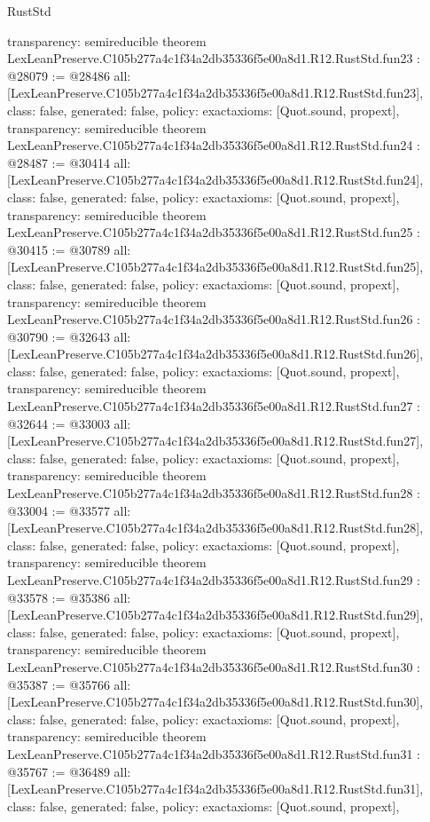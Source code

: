 \begin{lexlean}{RustStd}
\begin{coremodule}
{  transparency: semireducible
}
theorem LexLeanPreserve.C105b277a4c1f34a2db35336f5e00a8d1.R12.RustStd.fun23 : @28079 := @28486 {
  all: [LexLeanPreserve.C105b277a4c1f34a2db35336f5e00a8d1.R12.RustStd.fun23],
  class: false,
  generated: false,
  policy: exact{axioms: [Quot.sound, propext]},
  transparency: semireducible
}
theorem LexLeanPreserve.C105b277a4c1f34a2db35336f5e00a8d1.R12.RustStd.fun24 : @28487 := @30414 {
  all: [LexLeanPreserve.C105b277a4c1f34a2db35336f5e00a8d1.R12.RustStd.fun24],
  class: false,
  generated: false,
  policy: exact{axioms: [Quot.sound, propext]},
  transparency: semireducible
}
theorem LexLeanPreserve.C105b277a4c1f34a2db35336f5e00a8d1.R12.RustStd.fun25 : @30415 := @30789 {
  all: [LexLeanPreserve.C105b277a4c1f34a2db35336f5e00a8d1.R12.RustStd.fun25],
  class: false,
  generated: false,
  policy: exact{axioms: [Quot.sound, propext]},
  transparency: semireducible
}
theorem LexLeanPreserve.C105b277a4c1f34a2db35336f5e00a8d1.R12.RustStd.fun26 : @30790 := @32643 {
  all: [LexLeanPreserve.C105b277a4c1f34a2db35336f5e00a8d1.R12.RustStd.fun26],
  class: false,
  generated: false,
  policy: exact{axioms: [Quot.sound, propext]},
  transparency: semireducible
}
theorem LexLeanPreserve.C105b277a4c1f34a2db35336f5e00a8d1.R12.RustStd.fun27 : @32644 := @33003 {
  all: [LexLeanPreserve.C105b277a4c1f34a2db35336f5e00a8d1.R12.RustStd.fun27],
  class: false,
  generated: false,
  policy: exact{axioms: [Quot.sound, propext]},
  transparency: semireducible
}
theorem LexLeanPreserve.C105b277a4c1f34a2db35336f5e00a8d1.R12.RustStd.fun28 : @33004 := @33577 {
  all: [LexLeanPreserve.C105b277a4c1f34a2db35336f5e00a8d1.R12.RustStd.fun28],
  class: false,
  generated: false,
  policy: exact{axioms: [Quot.sound, propext]},
  transparency: semireducible
}
theorem LexLeanPreserve.C105b277a4c1f34a2db35336f5e00a8d1.R12.RustStd.fun29 : @33578 := @35386 {
  all: [LexLeanPreserve.C105b277a4c1f34a2db35336f5e00a8d1.R12.RustStd.fun29],
  class: false,
  generated: false,
  policy: exact{axioms: [Quot.sound, propext]},
  transparency: semireducible
}
theorem LexLeanPreserve.C105b277a4c1f34a2db35336f5e00a8d1.R12.RustStd.fun30 : @35387 := @35766 {
  all: [LexLeanPreserve.C105b277a4c1f34a2db35336f5e00a8d1.R12.RustStd.fun30],
  class: false,
  generated: false,
  policy: exact{axioms: [Quot.sound, propext]},
  transparency: semireducible
}
theorem LexLeanPreserve.C105b277a4c1f34a2db35336f5e00a8d1.R12.RustStd.fun31 : @35767 := @36489 {
  all: [LexLeanPreserve.C105b277a4c1f34a2db35336f5e00a8d1.R12.RustStd.fun31],
  class: false,
  generated: false,
  policy: exact{axioms: [Quot.sound, propext]},
}
\end{coremodule}
\end{lexlean}
